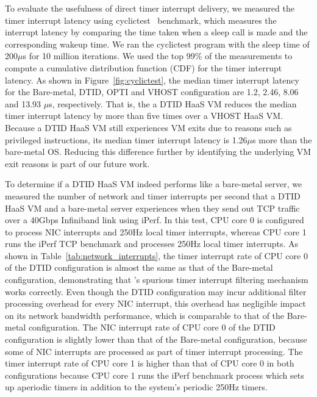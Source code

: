 To evaluate the usefulness of direct timer interrupt delivery, we 
measured the timer interrupt latency using cyclictest~\cite{cyclictest} benchmark, which 
measures the interrupt latency by comparing the time taken when a sleep 
call is made and the corresponding wakeup time. 
We ran the cyclictest program with the sleep time of 200$\mu$s for 10 million
iterations. 
We used the top 99\% of the measurements to compute a cumulative distribution function (CDF)
for the timer interrupt latency. As shown in Figure~\ref{fig:cyclictest}, the 
median timer interrupt latency for the Bare-metal, DTID, OPTI and
VHOST configuration are 1.2, 2.46, 8.06 and 13.93 $\mu$s, respectively.
That is, the a DTID HaaS VM reduces the median timer interrupt latency by
more than five times over a VHOST HaaS VM.
Because a DTID HaaS VM still experiences VM exits due to reasons such as privileged instructions,
its median timer interrupt latency is 1.26$\mu$s more than the bare-metal OS. 
Reducing this difference further by identifying the underlying VM exit reasons 
is part of our future work.


To determine if a DTID HaaS VM indeed performs like a bare-metal server,
we measured the number of network and timer interrupts per second that a DTID HaaS VM and a bare-metal server
experiences when they send out TCP traffic over a 40Gbps Infiniband link using iPerf.
In this test, CPU core 0 is configured to process NIC interrupts and 250Hz local timer interrupts, whereas CPU core 1 runs the 
iPerf TCP benchmark and processes 250Hz local timer interrupts.
As shown in Table~\ref{tab:network_interrupts},
the timer interrupt rate of CPU core 0 of the DTID configuration is almost the same as that of the Bare-metal configuration, 
demonstrating that \sna's spurious timer interrupt filtering mechanism works correctly. 
Even though the DTID configuration may incur additional filter processing overhead for every NIC interrupt,
this overhead has negligible impact on its network bandwidth performance, which is comparable to that of the Bare-metal 
configuration.   
The NIC interrupt rate of CPU core 0 of the DTID configuration is slightly lower than that of the Bare-metal configuration, 
because some of NIC interrupts are processed as part of timer interrupt processing.
The timer interrupt rate of CPU core 1 is higher than that of CPU core 0 in both configurations because CPU core 1 runs
the iPerf benchmark process which sets up aperiodic timers in addition to the system's periodic 250Hz timers. 




